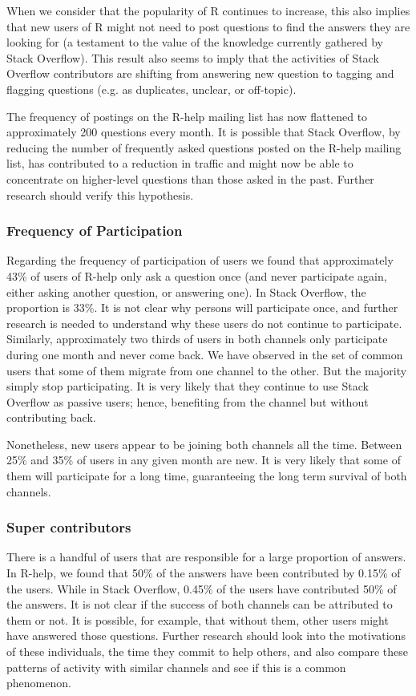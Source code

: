 \documentclass[smallextended]{svjour3}       %
\newcommand{\SO}{Stack Overflow\xspace}
\newcommand{\RH}{R-help\xspace}
\begin{document}
When we consider that the popularity of R continues to increase, this also implies that new users of R might not need to
post questions to find the answers they are looking for (a testament to the value of the knowledge currently gathered by
\SO). This result also seems to imply that the activities of \SO contributors are shifting from answering new question to
tagging and flagging questions  (e.g. as  duplicates, unclear, or off-topic).

The frequency of postings on the \RH mailing list has now flattened to approximately 200 questions every month. It is possible that
\SO, by reducing the number of frequently asked questions posted on the \RH mailing list, has contributed to a reduction in traffic and
might now be able to concentrate on higher-level questions than those asked in the past. Further research should verify
this hypothesis.


\subsubsection{Frequency of Participation}

Regarding the frequency of participation of users we found that approximately 43\% of users of \RH only ask a question
once (and never participate again, either asking another question, or answering one). In
\SO, the proportion is 33\%. It is not clear why persons will participate once, and further research is needed to
understand why these users do not continue to participate. Similarly, approximately two thirds of users in both channels
only participate during one month and never come back. We have observed in the set of common users that some of them
migrate from one channel to the other. But the majority simply stop participating. It is very likely that they continue
to use \SO as passive users; hence, benefiting from the channel but without contributing back.

Nonetheless, new users appear to be joining both channels all the time. Between 25\% and 35\% of users in any given month
are new. It is very likely that some of them will participate for a long time, guaranteeing the long term survival of
both channels.

\subsubsection{Super contributors}

There is a handful of users that are responsible for a large proportion of answers. In \RH, we found that 50\% of the
answers have been contributed by 0.15\% of the users. While in \SO, 0.45\% of the users have contributed 50\% of the answers. It is
not clear if the success of both channels can be attributed to them or not. It is possible, for example, that without
them, other users might have answered those questions. Further research should look into the motivations of these
individuals, the time they commit to help others, and also compare these patterns of activity with similar channels and
see if this is a common phenomenon.
\end{document}
